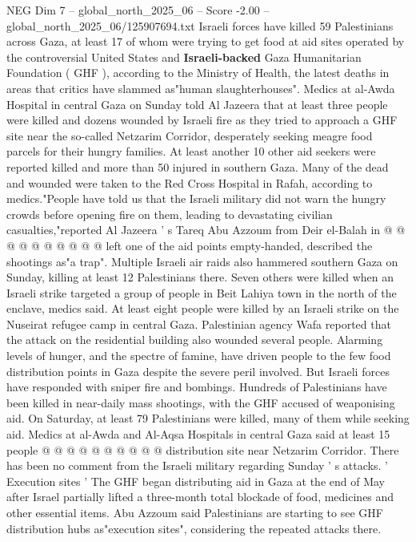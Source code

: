 \begin{textsample}{NEG Dim 7 – global\_north\_2025\_06 – Score -2.00 – global\_north\_2025\_06/125907694.txt}  \label{ex:f7_neg_074}
Israeli forces have killed 59 Palestinians across Gaza, at least 17 of whom were trying to get food at aid sites operated by the controversial United States and \textbf{Israeli-backed} Gaza Humanitarian Foundation ( GHF ), according to the Ministry of Health, the latest deaths in areas that critics have slammed as"human slaughterhouses".
Medics at al-Awda Hospital in central Gaza on Sunday told Al Jazeera that at least three people were killed and dozens wounded by Israeli fire as they tried to approach a GHF site near the so-called Netzarim Corridor, desperately seeking meagre food parcels for their hungry families.
At least another 10 other aid seekers were reported killed and more than 50 injured in southern Gaza.
Many of the dead and wounded were taken to the Red Cross Hospital in Rafah, according to medics."People have told us that the Israeli military did not warn the hungry crowds before opening fire on them, leading to devastating civilian casualties,"reported Al Jazeera ' s Tareq Abu Azzoum from Deir el-Balah in @ @ @ @ @ @ @ @ @ @ left one of the aid points empty-handed, described the shootings as"a trap".
Multiple Israeli air raids also hammered southern Gaza on Sunday, killing at least 12 Palestinians there.
Seven others were killed when an Israeli strike targeted a group of people in Beit Lahiya town in the north of the enclave, medics said.
At least eight people were killed by an Israeli strike on the Nuseirat refugee camp in central Gaza.
Palestinian agency Wafa reported that the attack on the residential building also wounded several people.
Alarming levels of hunger, and the spectre of famine, have driven people to the few food distribution points in Gaza despite the severe peril involved.
But Israeli forces have responded with sniper fire and bombings.
Hundreds of Palestinians have been killed in near-daily mass shootings, with the GHF accused of weaponising aid.
On Saturday, at least 79 Palestinians were killed, many of them while seeking aid.
Medics at al-Awda and Al-Aqsa Hospitals in central Gaza said at least 15 people @ @ @ @ @ @ @ @ @ @ distribution site near Netzarim Corridor.
There has been no comment from the Israeli military regarding Sunday ' s attacks. ' Execution sites ' The GHF began distributing aid in Gaza at the end of May after Israel partially lifted a three-month total blockade of food, medicines and other essential items.
Abu Azzoum said Palestinians are starting to see GHF distribution hubs as"execution sites", considering the repeated attacks there.

\end{textsample}

